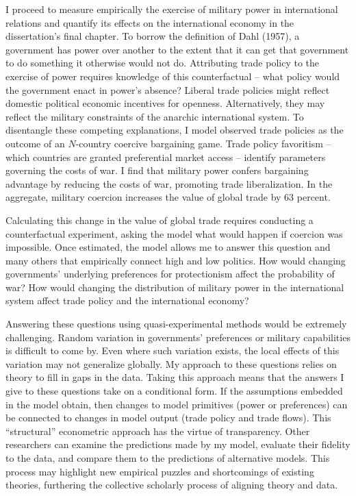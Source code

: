 \documentclass{puthesis}
\begin{document}
I proceed to measure empirically the exercise of military power in
international relations and quantify its effects on the international
economy in the dissertation's final chapter. To borrow the definition of
Dahl (1957), a government has power over another to the extent that it
can get that government to do something it otherwise would not do.
Attributing trade policy to the exercise of power requires knowledge of
this counterfactual -- what policy would the government enact in power's
absence? Liberal trade policies might reflect domestic political
economic incentives for openness. Alternatively, they may reflect the
military constraints of the anarchic international system. To
disentangle these competing explanations, I model observed trade
policies as the outcome of an \(N\)-country coercive bargaining game.
Trade policy favoritism -- which countries are granted preferential
market access -- identify parameters governing the costs of war. I find
that military power confers bargaining advantage by reducing the costs
of war, promoting trade liberalization. In the aggregate, military
coercion increases the value of global trade by 63 percent.

Calculating this change in the value of global trade requires conducting
a counterfactual experiment, asking the model what would happen if
coercion was impossible. Once estimated, the model allows me to answer
this question and many others that empirically connect high and low
politics. How would changing governments' underlying preferences for
protectionism affect the probability of war? How would changing the
distribution of military power in the international system affect trade
policy and the international economy?

Answering these questions using quasi-experimental methods would be
extremely challenging. Random variation in governments' preferences or
military capabilities is difficult to come by. Even where such variation
exists, the local effects of this variation may not generalize globally.
My approach to these questions relies on theory to fill in gaps in the
data. Taking this approach means that the answers I give to these
questions take on a conditional form. If the assumptions embedded in the
model obtain, then changes to model primitives (power or preferences)
can be connected to changes in model output (trade policy and trade
flows). This ``structural'' econometric approach has the virtue of
transparency. Other researchers can examine the predictions made by my
model, evaluate their fidelity to the data, and compare them to the
predictions of alternative models. This process may highlight new
empirical puzzles and shortcomings of existing theories, furthering the
collective scholarly process of aligning theory and data.
\end{document}
